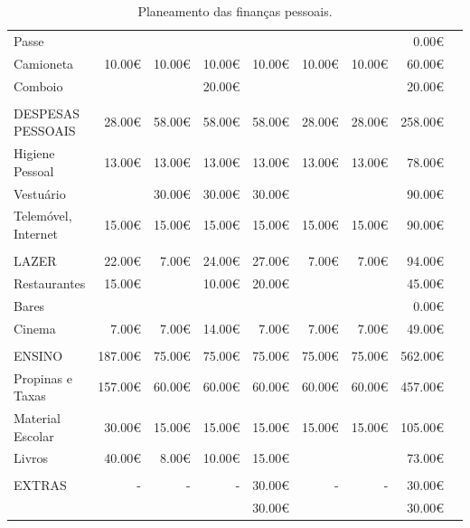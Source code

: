 \documentclass[a4paper,11pt]{report}
\begin{document}
\begin{table}[!htp]
\begin{tabular}{lrrrrrrrr}
				Passe & & & & & & &\cellcolor[HTML]{4285f4}0.00€ \\
				Camioneta &10.00€ &10.00€ &10.00€ &10.00€ &10.00€ &10.00€ &\cellcolor[HTML]{4285f4}60.00€ \\
				Comboio & & &20.00€ & & & &\cellcolor[HTML]{4285f4}20.00€ \\
				& & & & & & & \\
				\cellcolor[HTML]{4285f4}DESPESAS PESSOAIS &\cellcolor[HTML]{4285f4}28.00€ &\cellcolor[HTML]{4285f4}58.00€ &\cellcolor[HTML]{4285f4}58.00€ &\cellcolor[HTML]{4285f4}58.00€ &\cellcolor[HTML]{4285f4}28.00€ &\cellcolor[HTML]{4285f4}28.00€ &\cellcolor[HTML]{4285f4}258.00€ \\
				Higiene Pessoal &13.00€ &13.00€ &13.00€ &13.00€ &13.00€ &13.00€ &\cellcolor[HTML]{4285f4}78.00€ \\
				Vestuário & &30.00€ &30.00€ &30.00€ & & &\cellcolor[HTML]{4285f4}90.00€ \\
				Telemóvel, Internet &15.00€ &15.00€ &15.00€ &15.00€ &15.00€ &15.00€ &\cellcolor[HTML]{4285f4}90.00€ \\
				& & & & & & & \\
				\cellcolor[HTML]{4285f4}LAZER &\cellcolor[HTML]{4285f4}22.00€ &\cellcolor[HTML]{4285f4}7.00€ &\cellcolor[HTML]{4285f4}24.00€ &\cellcolor[HTML]{4285f4}27.00€ &\cellcolor[HTML]{4285f4}7.00€ &\cellcolor[HTML]{4285f4}7.00€ &\cellcolor[HTML]{4285f4}94.00€ \\
				Restaurantes &15.00€ & &10.00€ &20.00€ & & &\cellcolor[HTML]{4285f4}45.00€ \\
				Bares & & & & & & &\cellcolor[HTML]{4285f4}0.00€ \\
				Cinema &7.00€ &7.00€ &14.00€ &7.00€ &7.00€ &7.00€ &\cellcolor[HTML]{4285f4}49.00€ \\
				& & & & & & & \\
				\cellcolor[HTML]{4285f4}ENSINO &\cellcolor[HTML]{4285f4}187.00€ &\cellcolor[HTML]{4285f4}75.00€ &\cellcolor[HTML]{4285f4}75.00€ &\cellcolor[HTML]{4285f4}75.00€ &\cellcolor[HTML]{4285f4}75.00€ &\cellcolor[HTML]{4285f4}75.00€ &\cellcolor[HTML]{4285f4}562.00€ \\
				Propinas e Taxas &157.00€ &60.00€ &60.00€ &60.00€ &60.00€ &60.00€ &\cellcolor[HTML]{4285f4}457.00€ \\
				Material Escolar &30.00€ &15.00€ &15.00€ &15.00€ &15.00€ &15.00€ &\cellcolor[HTML]{4285f4}105.00€ \\
				Livros &40.00€ &8.00€ &10.00€ &15.00€ & & &\cellcolor[HTML]{4285f4}73.00€ \\
				& & & & & & & \\
				\cellcolor[HTML]{4285f4}EXTRAS &\cellcolor[HTML]{4285f4}- &\cellcolor[HTML]{4285f4}- &\cellcolor[HTML]{4285f4}- &\cellcolor[HTML]{4285f4}30.00€ &\cellcolor[HTML]{4285f4}- &\cellcolor[HTML]{4285f4}- &\cellcolor[HTML]{4285f4}30.00€ \\
				& & & &30.00€ & & &\cellcolor[HTML]{4285f4}30.00€ \\
				\bottomrule
			\end{tabular}
			\caption{Planeamento das finanças pessoais.}\label{tab:planeamento }
		\end{table}
		
\end{document}
